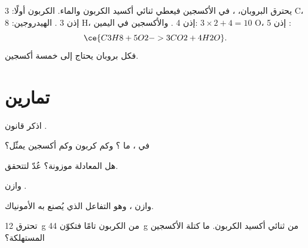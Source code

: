\begin{example}\label{ex:g8:balanced-equations:propane}
يحترق البروبان، ، في الأكسجين فيعطي ثنائي أكسيد الكربون والماء.
الكربون أولًا: 3 C، إذن 3 . الهيدروجين: 8 H، إذن 4 .
والأكسجين في اليمين: $3 \times 2 + 4 = 10$ O، إذن 5 :
\[
  \ce{C3H8 + 5O2 -> 3CO2 + 4H2O}.
\]
فكل  بروبان يحتاج إلى خمسة  أكسجين.
\end{example}

\section{تمارين}

\begin{exercise}[$\star$]\label{exo:g8:balanced-equations:1}
اذكر قانون .
\end{exercise}

\begin{exercise}[$\star$]\label{exo:g8:balanced-equations:2}
في ، ما ؟ وكم  كربون وكم  أكسجين
يمثّل؟
\end{exercise}

\begin{exercise}[$\star$]\label{exo:g8:balanced-equations:3}
هل المعادلة  موزونة؟ عُدّ  لتتحقق.
\end{exercise}

\begin{exercise}[$\star$]\label{exo:g8:balanced-equations:4}
وازن . %
\end{exercise}

\begin{exercise}[$\star\star$]\label{exo:g8:balanced-equations:5}
وازن ، وهو التفاعل الذي يُصنع به الأمونياك. %
\end{exercise}

\begin{exercise}[$\star\star$]\label{exo:g8:balanced-equations:6}
تحترق \qty{12}{g} من الكربون  تامًا فتكوّن \qty{44}{g} من ثنائي
أكسيد الكربون. ما كتلة الأكسجين المستهلكة؟
\end{exercise}

